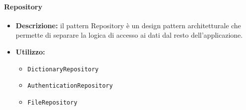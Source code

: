 \paragraph{Repository}
\begin{itemize}
    \item{\textbf{Descrizione:}} il pattern Repository è un design pattern architetturale che permette di separare la logica di accesso ai dati dal resto dell'applicazione.
    \item{\textbf{Utilizzo:}}
    \begin{itemize}
        \item \texttt{DictionaryRepository}
        \item \texttt{AuthenticationRepository}
        \item \texttt{FileRepository}
    \end{itemize}
\end{itemize}